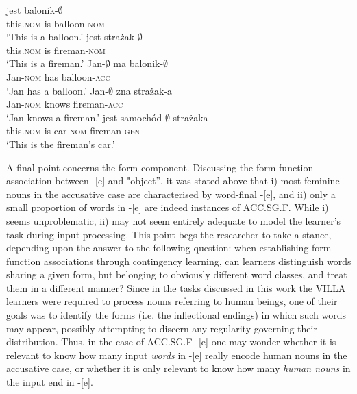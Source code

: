 \ea%
    \label{ex:08:7}
    \ea\label{ex:08:7a}
        {jest}  {balonik{}-${\emptyset}$}\\
            this\textsc{.nom}  is  balloon\textsc{-nom}\\
    \glt    ‘This is a balloon.’
    \ex\label{ex:08:7b}
        {jest}  {strażak-${\emptyset}$}\\
            this\textsc{.nom}  is  fireman\textsc{-nom}\\
    \glt    ‘This is a fireman.’
    \ex\label{ex:08:7c}
    \gll    Jan-${\emptyset}$    ma  balonik-${\emptyset}$\\
            Jan\textsc{-nom}  has  balloon\textsc{-acc}\\
    \glt    ‘Jan has a balloon.’
    \ex\label{ex:08:7d}
    \gll    Jan-${\emptyset}$    zna  strażak-a\\
            Jan\textsc{-nom}  knows  fireman\textsc{-acc}\\
    \glt    ‘Jan knows a fireman.’
    \ex\label{ex:08:7e}
        {jest}  {samochód-${\emptyset}$}  {strażaka}\\
            this\textsc{.nom}  is  car\textsc{-nom}  fireman\textsc{-gen}\\
    \glt    ‘This is the fireman's car.’
    \z
\z

A final point concerns the form component. Discussing the form-function association between -[e] and "object”, it was stated above that i) most feminine nouns in the accusative case are characterised by word-final -[e], and ii) only a small proportion of words in -[e] are indeed instances of ACC.SG.F. While i) seems unproblematic, ii) may not seem entirely adequate to model the learner’s task during input processing. This point begs the researcher to take a stance, depending upon the answer to the following question: when establishing form-func\-tion associations through contingency learning, can learners distinguish words sharing a given form, but belonging to obviously different word classes, and treat them in a different manner? Since in the tasks discussed in this work the VILLA learners were required to process nouns referring to human beings, one of their goals was to identify the forms (i.e. the inflectional endings) in which such words may appear, possibly attempting to discern any regularity governing their distribution. Thus, in the case of ACC.SG.F -[e] one may wonder whether it is relevant to know how many input \textit{words} in -[e] really encode human nouns in the accusative case, or whether it is only relevant to know how many \textit{human nouns} in the input end in -[e].

